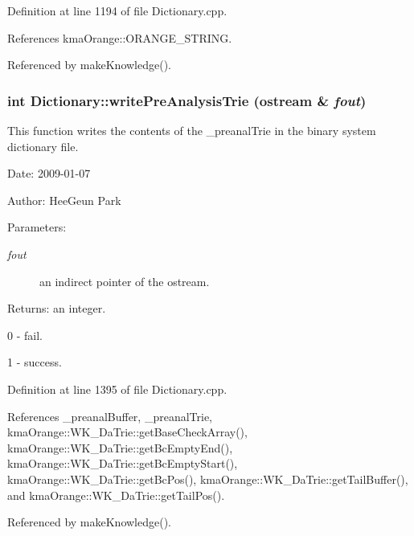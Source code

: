 Definition at line 1194 of file Dictionary.cpp.

References kmaOrange::ORANGE\_\-STRING.

Referenced by makeKnowledge().\hypertarget{classkmaOrange_1_1Dictionary_0a8a9746a6199a64ed7b7b340d982aeb}{
\subsubsection[{writePreAnalysisTrie}]{\setlength{\rightskip}{0pt plus 5cm}int Dictionary::writePreAnalysisTrie (ostream \& {\em fout})}}
\label{classkmaOrange_1_1Dictionary_0a8a9746a6199a64ed7b7b340d982aeb}


This function writes the contents of the \_\-preanalTrie in the binary system dictionary file. 

\begin{Desc}
\item[Date:]2009-01-07 \end{Desc}
\begin{Desc}
\item[Author:]HeeGeun Park \end{Desc}
\begin{Desc}
\item[Parameters:]
\begin{description}
\item[{\em fout}]an indirect pointer of the ostream. \end{description}
\end{Desc}
\begin{Desc}
\item[Returns:]an integer.\par
 0 - fail.\par
 1 - success. \end{Desc}


Definition at line 1395 of file Dictionary.cpp.

References \_\-preanalBuffer, \_\-preanalTrie, kmaOrange::WK\_\-DaTrie::getBaseCheckArray(), kmaOrange::WK\_\-DaTrie::getBcEmptyEnd(), kmaOrange::WK\_\-DaTrie::getBcEmptyStart(), kmaOrange::WK\_\-DaTrie::getBcPos(), kmaOrange::WK\_\-DaTrie::getTailBuffer(), and kmaOrange::WK\_\-DaTrie::getTailPos().

Referenced by makeKnowledge().

